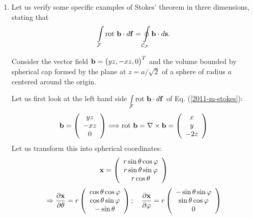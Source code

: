 {\begin{enumerate}
\item
Let us verify  some specific examples of Stokes' theorem in three dimensions,
stating that
\begin{equation}
\int \limits_{\cal F} \textrm{rot } {\bf b} \cdot d{\bf f}   =\oint \limits_{{\cal C}_{\cal F}} {\bf b} \cdot d{\bf s}
.   \label{2011-m-stokes}
\end{equation}

Consider the vector field ${\bf b} = \begin{pmatrix} yz , -xz , 0 \end{pmatrix}^T$
and the volume bounded by spherical cap
formed by the plane at $z = a / \sqrt{2}$ of a sphere of radius $a$ centered around the origin.

Let us first look at the left hand side $\int \limits_{\cal F} \textrm{rot } {\bf b} \cdot d{\bf f} $
of Eq. (\ref{2011-m-stokes}):
$$
  {\bf b}=
  \left(
    \begin{array}{c}
      yz \\
      -xz \\
      0
    \end{array}
  \right)
  \Longrightarrow
  \textrm{rot } {\bf b} = \nabla \times {\bf b} =
  \left(
    \begin{array}{c}
      x \\
      y \\
      -2z
    \end{array}
  \right)
$$
Let us transform this into spherical coordinates:
$$
  {\bf x}=
  \left(
    \begin{array}{c}
      r\sin \theta \cos \varphi \\
      r\sin \theta \sin \varphi \\
      r\cos \theta
    \end{array}
  \right)
$$
$$
  \Rightarrow
  \frac{\partial {\bf x}}{\partial \theta}=
  r
  \left(
    \begin{array}{c}
      \cos \theta \cos \varphi \\
      \cos \theta \sin \varphi \\
      -\sin \theta
    \end{array}
  \right);\quad
  \frac{\partial {\bf x}}{\partial \varphi}=
  r
  \left(
    \begin{array}{c}
      -\sin \theta \sin \varphi \\
      \sin \theta \cos \varphi \\
      0
    \end{array}
  \right)
$$
\end{enumerate}}
